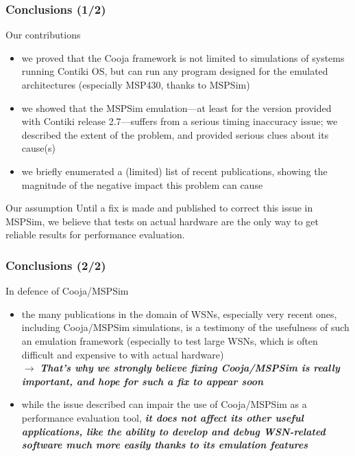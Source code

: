 \documentclass[10pt,c]{beamer}
\renewcommand{\emph}[1]{\textbf{\textit{#1}}}
\begin{document}
\begin{frame}
\frametitle{Conclusions (1/2)}
\vspace{-0.25cm}
\begin{block}{Our contributions}
\begin{itemize}
\item we proved that the Cooja framework is not limited to simulations
of systems running Contiki OS, but can run any program designed for the
emulated architectures (especially MSP430, thanks to MSPSim)
\item we showed that the MSPSim emulation---at least for the version
provided with Contiki release 2.7---suffers from a serious timing inaccuracy
issue; we described the extent of the problem, and provided serious clues
about its cause(s)
\item we briefly enumerated a (limited) list of recent publications,
showing the magnitude of the negative impact this problem can cause
\end{itemize}
\end{block}
\vspace{-0.25cm}
\begin{alertblock}{Our assumption}
Until a fix is made and published to correct this issue in MSPSim,
we believe that tests on actual hardware are the only way to get
reliable results for performance evaluation.
\end{alertblock}
\end{frame}

\begin{frame}
\frametitle{Conclusions (2/2)}
\begin{exampleblock}{In defence of Cooja/MSPSim}
\begin{itemize}
\item the many publications in the domain of WSNs, especially very recent
ones, including Cooja/MSPSim simulations, is a testimony of the usefulness
of such an emulation framework (especially to test large WSNs, which is
often difficult and expensive to with actual hardware) \\
$\rightarrow$ \emph{That's why we strongly believe fixing Cooja/MSPSim
is really important, and hope for such a fix to appear soon}
\item while the issue described can impair the use of Cooja/MSPSim as
a performance evaluation tool, \emph{it does not affect its other useful
applications, like the ability to develop and debug WSN-related software
much more easily thanks to its emulation features}
\end{itemize}
\end{exampleblock}
\end{frame}
\end{document}
